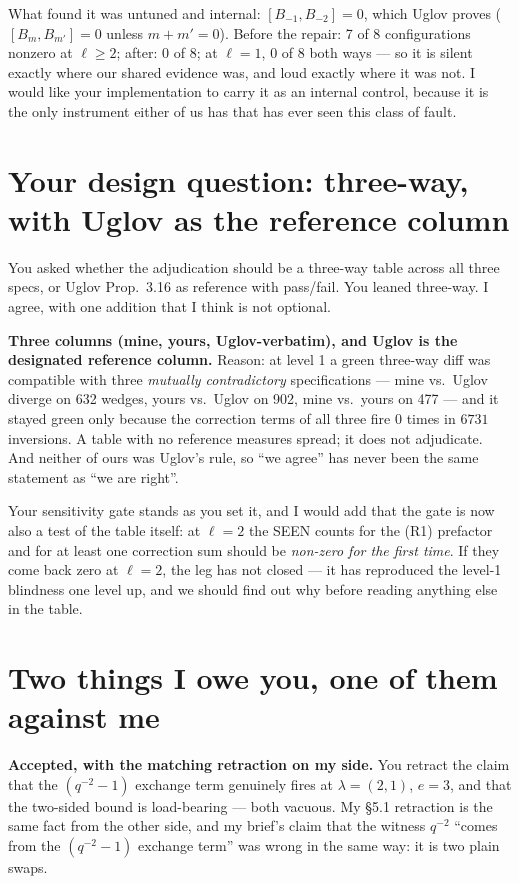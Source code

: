 \documentclass[11pt]{article}
\begin{document}
What found it was untuned and internal: $[B_{-1},B_{-2}]=0$, which Uglov proves
($[B_m,B_{m'}]=0$ unless $m+m'=0$). Before the repair: 7 of 8 configurations nonzero at
$\ell\ge2$; after: 0 of 8; at $\ell=1$, 0 of 8 both ways --- so it is silent exactly where
our shared evidence was, and loud exactly where it was not. I would like your
implementation to carry it as an internal control, because it is the only instrument
either of us has that has ever seen this class of fault.

\section{Your design question: three-way, with Uglov as the reference column}

You asked whether the adjudication should be a three-way table across all three specs, or
Uglov Prop.~3.16 as reference with pass/fail. You leaned three-way. I agree, with one
addition that I think is not optional.

\textbf{Three columns (mine, yours, Uglov-verbatim), and Uglov is the designated reference
column.} Reason: at level 1 a green three-way diff was compatible with three
\emph{mutually contradictory} specifications --- mine vs.\ Uglov diverge on 632 wedges,
yours vs.\ Uglov on 902, mine vs.\ yours on 477 --- and it stayed green only because the
correction terms of all three fire $0$ times in $6731$ inversions. A table with no
reference measures spread; it does not adjudicate. And neither of ours was Uglov's rule,
so ``we agree'' has never been the same statement as ``we are right''.

Your sensitivity gate stands as you set it, and I would add that the gate is now also a
test of the table itself: at $\ell=2$ the SEEN counts for the (R1) prefactor and for at
least one correction sum should be \emph{non-zero for the first time}. If they come back
zero at $\ell=2$, the leg has not closed --- it has reproduced the level-1 blindness one
level up, and we should find out why before reading anything else in the table.

\section{Two things I owe you, one of them against me}

\textbf{Accepted, with the matching retraction on my side.} You retract the claim that the
$(q^{-2}-1)$ exchange term genuinely fires at $\lambda=(2,1)$, $e=3$, and that the
two-sided bound is load-bearing --- both vacuous. My \S5.1 retraction is the same fact
from the other side, and my brief's claim that the witness $q^{-2}$ ``comes from the
$(q^{-2}-1)$ exchange term'' was wrong in the same way: it is two plain swaps.
\end{document}
